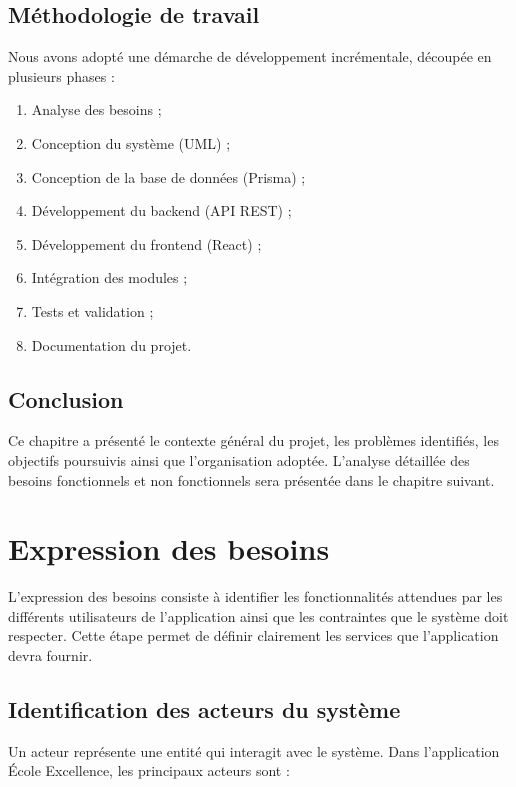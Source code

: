 \documentclass[12pt, a4paper]{report}
\begin{document}
\section{Méthodologie de travail}
Nous avons adopté une démarche de développement incrémentale, découpée en plusieurs phases :
\begin{enumerate}[noitemsep]
    \item Analyse des besoins ;
    \item Conception du système (UML) ;
    \item Conception de la base de données (Prisma) ;
    \item Développement du backend (API REST) ;
    \item Développement du frontend (React) ;
    \item Intégration des modules ;
    \item Tests et validation ;
    \item Documentation du projet.
\end{enumerate}

\section{Conclusion}
Ce chapitre a présenté le contexte général du projet, les problèmes identifiés, les objectifs poursuivis ainsi que l'organisation adoptée. L'analyse détaillée des besoins fonctionnels et non fonctionnels sera présentée dans le chapitre suivant.

\chapter{Expression des besoins}

L'expression des besoins consiste à identifier les fonctionnalités attendues par les différents utilisateurs de l'application ainsi que les contraintes que le système doit respecter. Cette étape permet de définir clairement les services que l'application devra fournir.

\section{Identification des acteurs du système}
Un acteur représente une entité qui interagit avec le système. Dans l'application École Excellence, les principaux acteurs sont :
\end{document}

